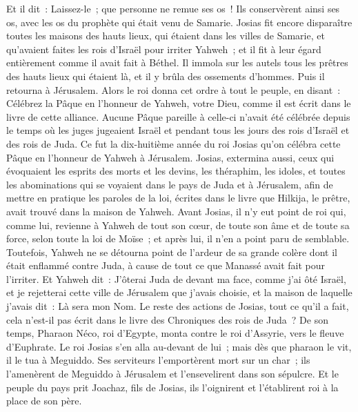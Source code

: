 \begin{multicols}{2}
Et il dit~: Laissez-le~; que personne ne remue ses os~! Ils conservèrent ainsi ses os, avec les os du prophète qui était venu de Samarie.
Josias fit encore disparaître toutes les maisons des hauts lieux, qui étaient dans les villes de Samarie, et qu'avaient faites les rois d'Israël pour irriter Yahweh~; et il fit à leur égard entièrement comme il avait fait à Béthel.
Il immola sur les autels tous les prêtres des hauts lieux qui étaient là, et il y brûla des ossements d'hommes. Puis il retourna à Jérusalem.
Alors le roi donna cet ordre à tout le peuple, en disant~: Célébrez la Pâque en l'honneur de Yahweh, votre Dieu, comme il est écrit dans le livre de cette alliance.
Aucune Pâque pareille à celle-ci n'avait été célébrée depuis le temps où les juges jugeaient Israël et pendant tous les jours des rois d'Israël et des rois de Juda.
Ce fut la dix-huitième année du roi Josias qu'on célébra cette Pâque en l'honneur de Yahweh à Jérusalem.
Josias, extermina aussi, ceux qui évoquaient les esprits des morts et les devins, les théraphim, les idoles, et toutes les abominations qui se voyaient dans le pays de Juda et à Jérusalem, afin de mettre en pratique les paroles de la loi, écrites dans le livre que Hilkija, le prêtre, avait trouvé dans la maison de Yahweh.
Avant Josias, il n'y eut point de roi qui, comme lui, revienne à Yahweh de tout son cœur, de toute son âme et de toute sa force, selon toute la loi de Moïse~; et après lui, il n'en a point paru de semblable.
Toutefois, Yahweh ne se détourna point de l'ardeur de sa grande colère dont il était enflammé contre Juda, à cause de tout ce que Manassé avait fait pour l'irriter.
Et Yahweh dit~: J'ôterai Juda de devant ma face, comme j'ai ôté Israël, et je rejetterai cette ville de Jérusalem que j'avais choisie, et la maison de laquelle j'avais dit~: Là sera mon Nom.
Le reste des actions de Josias, tout ce qu'il a fait, cela n'est-il pas écrit dans le livre des Chroniques des rois de Juda~?
De son temps, Pharaon Néco, roi d'Egypte, monta contre le roi d'Assyrie, vers le fleuve d'Euphrate. Le roi Josias s'en alla au-devant de lui~; mais dès que pharaon le vit, il le tua à Meguiddo.
Ses serviteurs l'emportèrent mort sur un char~; ils l'amenèrent de Meguiddo à Jérusalem et l'ensevelirent dans son sépulcre. Et le peuple du pays prit Joachaz, fils de Josias, ils l'oignirent et l'établirent roi à la place de son père.

\end{multicols}

